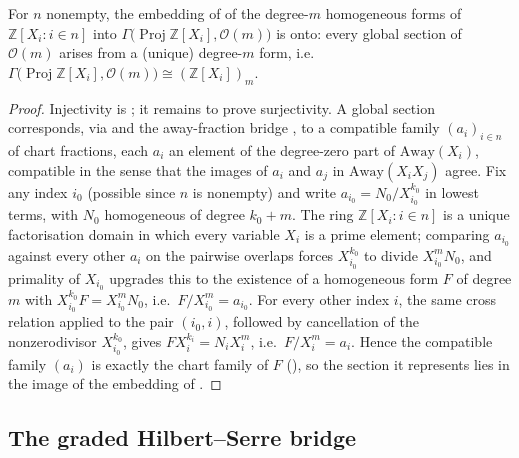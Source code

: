 \begin{lemma}
  \label{lem:serre_twist_sections}
  For \(n\) nonempty, the embedding of  of
  the degree-\(m\) homogeneous forms of \(\mathbb Z[X_i : i \in n]\) into
  \(\Gamma\bigl(\operatorname{Proj}\mathbb Z[X_i], \mathcal O(m)\bigr)\) is
  onto: every global section of \(\mathcal O(m)\) arises from a (unique)
  degree-\(m\) form, i.e.
  \(\Gamma\bigl(\operatorname{Proj}\mathbb Z[X_i], \mathcal O(m)\bigr)
  \cong (\mathbb Z[X_i])_m\).
\end{lemma}
\begin{proof}\leanok
  Injectivity is ; it remains to prove
  surjectivity. A global section corresponds, via
   and the away-fraction bridge
  , to a compatible family
  \((a_i)_{i \in n}\) of chart fractions, each \(a_i\) an element of the
  degree-zero part of \(\mathrm{Away}(X_i)\), compatible in the sense
  that the images of \(a_i\) and \(a_j\) in \(\mathrm{Away}(X_i X_j)\)
  agree. Fix any index \(i_0\) (possible since \(n\) is nonempty) and
  write \(a_{i_0} = N_0/X_{i_0}^{k_0}\) in lowest terms, with \(N_0\)
  homogeneous of degree \(k_0 + m\). The ring \(\mathbb Z[X_i : i \in n]\)
  is a unique factorisation domain in which every variable \(X_i\) is a
  prime element; comparing \(a_{i_0}\) against every other \(a_i\) on the
  pairwise overlaps forces \(X_{i_0}^{k_0}\) to divide \(X_{i_0}^m N_0\),
  and primality of \(X_{i_0}\) upgrades this to the existence of a
  homogeneous form \(F\) of degree \(m\) with
  \(X_{i_0}^{k_0} F = X_{i_0}^m N_0\), i.e.\ \(F/X_{i_0}^m = a_{i_0}\).
  For every other index \(i\), the same cross relation applied to the
  pair \((i_0, i)\), followed by cancellation of the nonzerodivisor
  \(X_{i_0}^{k_0}\), gives \(F X_i^{k_i} = N_i X_i^m\), i.e.\
  \(F/X_i^m = a_i\). Hence the compatible family \((a_i)\) is exactly the
  chart family of \(F\) (\Cref{lem:serre_twist_form_compatible}), so the
  section it represents lies in the image of the embedding of
  .
\end{proof}

\subsection{The graded Hilbert--Serre bridge}
\label{subsec:graded_hilbert_bridge}

